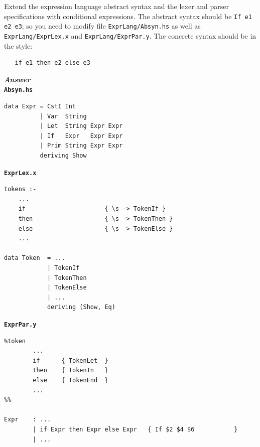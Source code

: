 \documentclass[a4paper]{article}
\begin{document}
\begin{exercise}\label{exer-expr-conditional}
  Extend the expression language abstract syntax and the lexer and
  parser specifications with conditional expressions.  The abstract
  syntax should be \texttt{If e1 e2 e3}; so you need to modify file
  \texttt{ExprLang/Absyn.hs} as well as \texttt{ExprLang/ExprLex.x} and
  \texttt{ExprLang/ExprPar.y}.  The concrete syntax should be in the
  style:

{\codesetup\begin{verbatim}
   if e1 then e2 else e3
\end{verbatim}}

\noindent
\textbf{\emph{Answer}} \\

\noindent
\texttt{\textbf{Absyn.hs}}
{\codesetup\begin{verbatim}
data Expr = CstI Int 
          | Var  String 
          | Let  String Expr Expr
          | If   Expr   Expr Expr
          | Prim String Expr Expr
          deriving Show
\end{verbatim}} 

\noindent
\texttt{\textbf{ExprLex.x}}
{\codesetup\begin{verbatim}
tokens :-
    ...
    if                      { \s -> TokenIf }
    then                    { \s -> TokenThen }
    else                    { \s -> TokenElse }
    ...

data Token  = ... 
            | TokenIf
            | TokenThen
            | TokenElse
            | ...
            deriving (Show, Eq)

\end{verbatim}} 

\noindent
\texttt{\textbf{ExprPar.y}}
{\codesetup\begin{verbatim}
%token 
        ...
        if      { TokenLet  }
        then    { TokenIn   }
        else    { TokenEnd  }
        ...
%%

Expr    : ...
        | if Expr then Expr else Expr   { If $2 $4 $6           }
        | ...
\end{verbatim}} 
\end{exercise}
\end{document}
